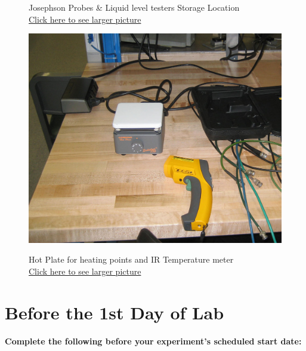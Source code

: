 \documentclass{../lab}
\begin{document}
\begin{figure}[!htb]
  \caption{Josephson Probes \& Liquid level testers Storage Location \\ \href{http://experimentationlab.berkeley.edu/sites/default/files/images/JOS-Probes_3506.jpg}{Click here to see larger picture}}\label{fig:JOS-Probes_3506.jpg}
\endminipage\hfill
{}
  \href{http://experimentationlab.berkeley.edu/sites/default/files/images/HotPlate-JOS_3505-Lg.jpg}{\includegraphics[width=\linewidth,keepaspectratio]{images/HotPlate-JOS_3505-Lg.jpg}}
  \caption{Hot Plate for heating points and IR Temperature meter \\ \href{http://experimentationlab.berkeley.edu/sites/default/files/images/HotPlate-JOS_3505-Lg.jpg}{Click here to see larger picture}}\label{fig:otPlate-JOS_3505-Lg.jpg}
\endminipage
\end{figure}

\section{Before the 1st Day of Lab}

\textbf{Complete the following before your experiment's scheduled start date:}
\end{document}
